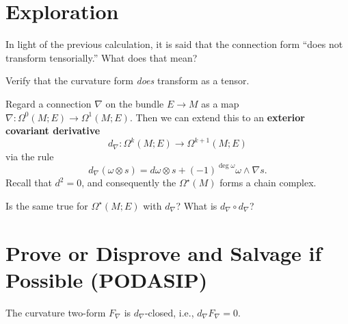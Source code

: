 \documentclass{homework}
\begin{document}
\section{Exploration}

\begin{problem} In light of the previous calculation, it is said that
the connection form ``does not transform tensorially.''  What does
that mean?
\end{problem}

\begin{problem} Verify that the curvature form \textit{does} transform
as a tensor.
\end{problem}

\begin{problem}
  Regard a connection $\nabla$ on the bundle $E \to M$ as a map $\nabla : \Omega^0(M;E) \to \Omega^1(M;E)$.  Then we can extend this to an \textbf{exterior covariant derivative} 
  \[
    d_{\nabla }:\Omega ^{k}(M;E)\to \Omega ^{k+1}(M;E)
  \]
  via the rule
  \[
    d_{\nabla }(\omega \otimes s)=d\omega \otimes s + (-1)^{\deg \omega} \omega \wedge \nabla s.
  \]
  Recall that $d^2 = 0$, and consequently the $\Omega^\star(M)$ forms a chain complex.

  Is the same true for $\Omega^\star(M;E)$ with $d_\nabla$?  What is $d_\nabla \circ d_\nabla$?
\end{problem}

\section{Prove or Disprove and Salvage if Possible (PODASIP)}

\begin{problem}
 The curvature two-form $F_\nabla$ is $d_\nabla$-closed, i.e., \(
    d_\nabla F_\nabla = 0
   \).
\end{problem}
\end{document}
